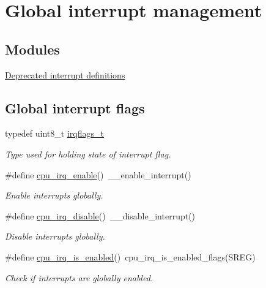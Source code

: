 \hypertarget{group__interrupt__group}{\section{Global interrupt management}
\label{group__interrupt__group}
}
\subsection*{Modules}
\begin{DoxyCompactItemize}
\item 
\hyperlink{group__interrupt__deprecated__group}{Deprecated interrupt definitions}
\end{DoxyCompactItemize}
\subsection*{Global interrupt flags}
\begin{DoxyCompactItemize}
\item 
typedef uint8\-\_\-t \hyperlink{group__interrupt__group_ga9aa1f52defc97531b6343233abeea613}{irqflags\-\_\-t}
\begin{DoxyCompactList}\small\item\em Type used for holding state of interrupt flag. \end{DoxyCompactList}\item 
\#define \hyperlink{group__interrupt__group_gae4922a4bd8ba4150211fbc7f2302403c}{cpu\-\_\-irq\-\_\-enable}()~\-\_\-\-\_\-enable\-\_\-interrupt()
\begin{DoxyCompactList}\small\item\em Enable interrupts globally. \end{DoxyCompactList}\item 
\#define \hyperlink{group__interrupt__group_ga7b77391ed86e2e027f9ee1dd99a06980}{cpu\-\_\-irq\-\_\-disable}()~\-\_\-\-\_\-disable\-\_\-interrupt()
\begin{DoxyCompactList}\small\item\em Disable interrupts globally. \end{DoxyCompactList}\item 
\#define \hyperlink{group__interrupt__group_gae1545a2473614564550b9c4015c94978}{cpu\-\_\-irq\-\_\-is\-\_\-enabled}()~cpu\-\_\-irq\-\_\-is\-\_\-enabled\-\_\-flags(S\-R\-E\-G)
\begin{DoxyCompactList}\small\item\em Check if interrupts are globally enabled. \end{DoxyCompactList}\end{DoxyCompactItemize}


